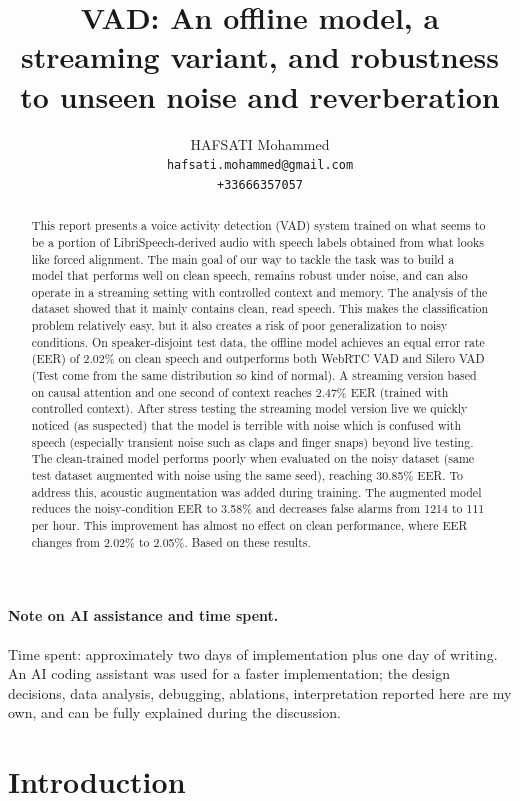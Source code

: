 \documentclass{article}
\title{VAD: An offline model, a streaming variant, and robustness to unseen noise and reverberation}
\author{%
  HAFSATI Mohammed \\
  \texttt{hafsati.mohammed@gmail.com} \\
  \texttt{+33666357057}
}
\begin{document}
\maketitle

\begin{abstract}
This report presents a voice activity detection (VAD) system trained on what seems to be a portion of LibriSpeech-derived audio with speech labels obtained from what looks like forced alignment. The main goal of our way to tackle the task was to build a model that performs well on clean speech, remains robust under noise, and can also operate in a streaming setting with controlled context and memory.
The analysis of the dataset showed that it mainly contains clean, read speech. This makes the classification problem relatively easy, but it also creates a risk of poor generalization to noisy conditions. On speaker-disjoint test data, the offline model achieves an equal error rate (EER) of 2.02\% on clean speech and outperforms both WebRTC VAD and Silero VAD (Test come from the same distribution so kind of normal). A streaming version based on causal attention and one second of context reaches 2.47\% EER (trained with controlled context). After stress testing the streaming model version live we quickly noticed (as suspected) that the model is terrible with noise which is confused with speech (especially transient noise such as claps and finger snaps) beyond live testing. The clean-trained model performs poorly when evaluated on the noisy dataset (same test dataset augmented with noise using the same seed), reaching 30.85\% EER. To address this, acoustic augmentation was added during training. The augmented model reduces the noisy-condition EER to 3.58\% and decreases false alarms from 1214 to 111 per hour. This improvement has almost no effect on clean performance, where EER changes from 2.02\% to 2.05\%. Based on these results.
\end{abstract}

\paragraph{Note on AI assistance and time spent.} Time spent: approximately two days of implementation plus one day of writing. An AI coding assistant was used for a faster implementation; the design decisions, data analysis, debugging, ablations, interpretation reported here are my own, and can be fully explained during the discussion. 

\section{Introduction}
\end{document}
